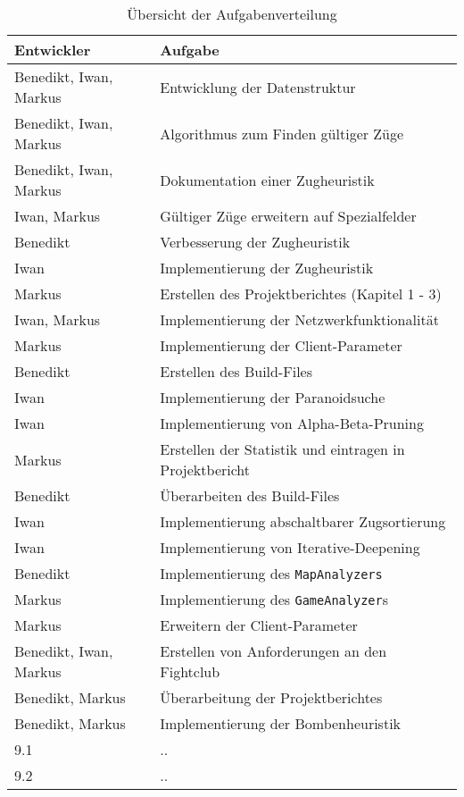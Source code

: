 \vspace{1em}
\begin{table}[!h]
    \centering
    \begin{tabular}{|l|l|}
        \hline
        \textbf{Entwickler} & \textbf{Aufgabe} \\
        \hline
        Benedikt, Iwan, Markus & Entwicklung der Datenstruktur\\
        \hline
        Benedikt, Iwan, Markus & Algorithmus zum Finden g\"ultiger Z\"uge \\
        \hline
        Benedikt, Iwan, Markus & Dokumentation einer Zugheuristik \\
        \hline
        Iwan, Markus & G\"ultiger Z\"uge erweitern auf Spezialfelder  \\
        \hline
        Benedikt & Verbesserung der Zugheuristik \\
        \hline
        Iwan & Implementierung der Zugheuristik \\
        \hline
        Markus & Erstellen des Projektberichtes (Kapitel 1 - 3) \\
        \hline
        Iwan, Markus & Implementierung der Netzwerkfunktionalit\"at \\
        \hline
        Markus & Implementierung der Client-Parameter \\
        \hline
        Benedikt & Erstellen des Build-Files \\
        \hline
        Iwan & Implementierung der Paranoidsuche \\
        \hline
        Iwan & Implementierung von Alpha-Beta-Pruning \\
        \hline
        Markus & Erstellen der Statistik und eintragen in Projektbericht \\
        \hline
        Benedikt & \"Uberarbeiten des Build-Files \\
        \hline
        Iwan & Implementierung abschaltbarer Zugsortierung \\
        \hline
        Iwan & Implementierung von Iterative-Deepening \\
        \hline
        Benedikt & Implementierung des \texttt{MapAnalyzers} \\
        \hline
        Markus & Implementierung des \texttt{GameAnalyzer}s \\
        \hline
        Markus & Erweitern der Client-Parameter \\
        \hline
        Benedikt, Iwan, Markus & Erstellen von Anforderungen an den Fightclub \\
        \hline
        Benedikt, Markus & \"Uberarbeitung der Projektberichtes \\
        \hline
        Benedikt, Markus & Implementierung der Bombenheuristik \\
        \hline
        9.1 & .. \\
        \hline
        9.2 & .. \\
        \hline
    \end{tabular}
    \caption{Übersicht der Aufgabenverteilung}
    \label{tab:arbeitsverteilung}
\end{table}

